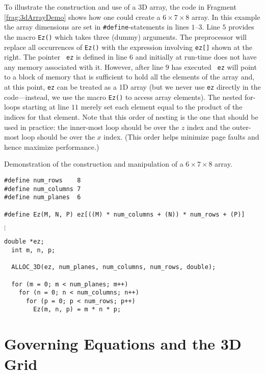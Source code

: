 To illustrate the construction and use of a 3D array, the code in
Fragment \ref{frag:3dArrayDemo} shows how one could create a $6\times
7\times 8$ array.  In this example the array dimensions are set in
{\tt \#define}-statements in lines $1$--$3$.  Line $5$ provides the
macro {\tt Ez()} which takes three (dummy) arguments.  The
preprocessor will replace all occurrences of {\tt Ez()} with the
expression involving {\tt ez[]} shown at the right.  The pointer {\tt
ez} is defined in line $6$ and initially at run-time does not have any
memory associated with it.  However, after line $9$ has executed {\tt
ez} will point to a block of memory that is sufficient to hold all the
elements of the array and, at this point, {\tt ez} can be treated as a
1D array (but we never use {\tt ez} directly in the code---instead, we
use the macro {\tt Ez()} to access array elements).  The nested
for-loops starting at line $11$ merely set each element equal to the
product of the indices for that element.  Note that this order of
nesting is the one that should be used in practice: the inner-most
loop should be over the $z$ index and the outer-most loop should be
over the $x$ index.  (This order helps minimize page faults and hence
maximize performance.)
\begin{fragment}
Demonstration of the construction and manipulation of a  $6\times
7\times 8$ array.
\label{frag:3dArrayDemo}
\codemiddle
\begin{lstlisting}
#define num_rows    8
#define num_columns 7
#define num_planes  6

#define Ez(M, N, P) ez[((M) * num_columns + (N)) * num_rows + (P)] 
\end{lstlisting}
\mbox{}\hspace{0.5in}$\vdots$
\begin{lstlisting}[firstnumber = last]
  double *ez;
  int m, n, p;

  ALLOC_3D(ez, num_planes, num_columns, num_rows, double);

  for (m = 0; m < num_planes; m++)
    for (n = 0; n < num_columns; n++)
      for (p = 0; p < num_rows; p++)
        Ez(m, n, p) = m * n * p;
\end{lstlisting}
\end{fragment}

\section{Governing Equations and the 3D Grid}

